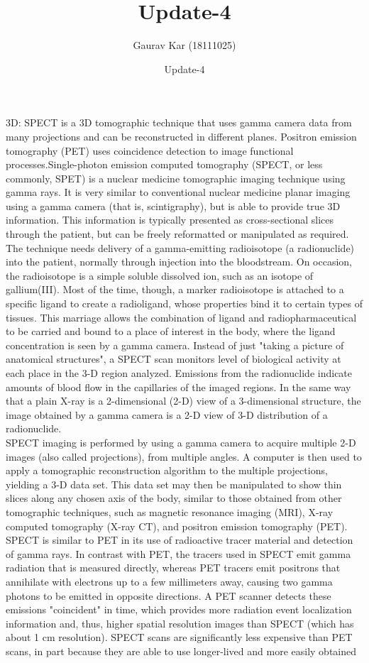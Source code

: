 \documentclass{article}
\title{Update-4}
\author{Gaurav Kar (18111025)}
\date{Update-4}
\begin{document}
\maketitle
3D: SPECT is a 3D tomographic technique that uses gamma camera data from many projections and can be reconstructed in different planes. Positron emission tomography (PET) uses coincidence detection to image functional processes.Single-photon emission computed tomography (SPECT, or less commonly, SPET) is a nuclear medicine tomographic imaging technique using gamma rays. It is very similar to conventional nuclear medicine planar imaging using a gamma camera (that is, scintigraphy), but is able to provide true 3D information. This information is typically presented as cross-sectional slices through the patient, but can be freely reformatted or manipulated as required.\\The technique needs delivery of a gamma-emitting radioisotope (a radionuclide) into the patient, normally through injection into the bloodstream. On occasion, the radioisotope is a simple soluble dissolved ion, such as an isotope of gallium(III). Most of the time, though, a marker radioisotope is attached to a specific ligand to create a radioligand, whose properties bind it to certain types of tissues. This marriage allows the combination of ligand and radiopharmaceutical to be carried and bound to a place of interest in the body, where the ligand concentration is seen by a gamma camera. Instead of just "taking a picture of anatomical structures", a SPECT scan monitors level of biological activity at each place in the 3-D region analyzed. Emissions from the radionuclide indicate amounts of blood flow in the capillaries of the imaged regions. In the same way that a plain X-ray is a 2-dimensional (2-D) view of a 3-dimensional structure, the image obtained by a gamma camera is a 2-D view of 3-D distribution of a radionuclide.\\SPECT imaging is performed by using a gamma camera to acquire multiple 2-D images (also called projections), from multiple angles. A computer is then used to apply a tomographic reconstruction algorithm to the multiple projections, yielding a 3-D data set. This data set may then be manipulated to show thin slices along any chosen axis of the body, similar to those obtained from other tomographic techniques, such as magnetic resonance imaging (MRI), X-ray computed tomography (X-ray CT), and positron emission tomography (PET).\\SPECT is similar to PET in its use of radioactive tracer material and detection of gamma rays. In contrast with PET, the tracers used in SPECT emit gamma radiation that is measured directly, whereas PET tracers emit positrons that annihilate with electrons up to a few millimeters away, causing two gamma photons to be emitted in opposite directions. A PET scanner detects these emissions "coincident" in time, which provides more radiation event localization information and, thus, higher spatial resolution images than SPECT (which has about 1 cm resolution). SPECT scans are significantly less expensive than PET scans, in part because they are able to use longer-lived and more easily obtained 
\end{document}
